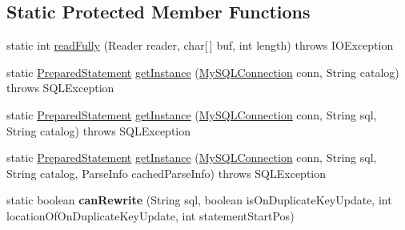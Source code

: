 \subsection*{Static Protected Member Functions}
\begin{DoxyCompactItemize}
\item 
static int \mbox{\hyperlink{classcom_1_1mysql_1_1jdbc_1_1_prepared_statement_a38e323114d62ae7b8bee091841dcee5d}{read\+Fully}} (Reader reader, char\mbox{[}$\,$\mbox{]} buf, int length)  throws I\+O\+Exception 
\item 
static \mbox{\hyperlink{classcom_1_1mysql_1_1jdbc_1_1_prepared_statement}{Prepared\+Statement}} \mbox{\hyperlink{classcom_1_1mysql_1_1jdbc_1_1_prepared_statement_a3f7dd0edd868d1c66f08be25392fba8e}{get\+Instance}} (\mbox{\hyperlink{interfacecom_1_1mysql_1_1jdbc_1_1_my_s_q_l_connection}{My\+S\+Q\+L\+Connection}} conn, String catalog)  throws S\+Q\+L\+Exception 
\item 
static \mbox{\hyperlink{classcom_1_1mysql_1_1jdbc_1_1_prepared_statement}{Prepared\+Statement}} \mbox{\hyperlink{classcom_1_1mysql_1_1jdbc_1_1_prepared_statement_a597b46826cbe709aaee73ee7ccb1ab85}{get\+Instance}} (\mbox{\hyperlink{interfacecom_1_1mysql_1_1jdbc_1_1_my_s_q_l_connection}{My\+S\+Q\+L\+Connection}} conn, String sql, String catalog)  throws S\+Q\+L\+Exception 
\item 
static \mbox{\hyperlink{classcom_1_1mysql_1_1jdbc_1_1_prepared_statement}{Prepared\+Statement}} \mbox{\hyperlink{classcom_1_1mysql_1_1jdbc_1_1_prepared_statement_a37bdcf9e02a649454447143c8b6361d7}{get\+Instance}} (\mbox{\hyperlink{interfacecom_1_1mysql_1_1jdbc_1_1_my_s_q_l_connection}{My\+S\+Q\+L\+Connection}} conn, String sql, String catalog, Parse\+Info cached\+Parse\+Info)  throws S\+Q\+L\+Exception 
\item 
\mbox{\label{classcom_1_1mysql_1_1jdbc_1_1_prepared_statement_ae9688cf850bf02e82d743aa85880d8b7}} 
static boolean {\bfseries can\+Rewrite} (String sql, boolean is\+On\+Duplicate\+Key\+Update, int location\+Of\+On\+Duplicate\+Key\+Update, int statement\+Start\+Pos)
\end{DoxyCompactItemize}
